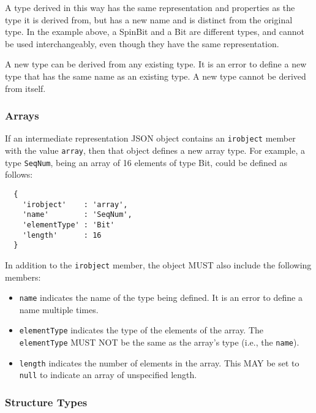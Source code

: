 \documentclass[twocolumn,a4paper]{article}
\begin{document}
A type derived in this way has the same representation and properties as
the type it is derived from, but has a new name and is distinct from the
original type.  In the example above, a SpinBit and a Bit are different
types, and cannot be used interchangeably, even though they have the same
representation.

A new type can be derived from any existing type. It is an error to define
a new type that has the same name as an existing type. A new type cannot be
derived from itself.

\subsubsection{Arrays}

If an intermediate representation JSON object contains an \texttt{irobject}
member with the value \texttt{array}, then that object defines a new array
type. For example, a type \texttt{SeqNum}, being an array of 16 elements of
type Bit, could be defined as follows:

\begin{verbatim}
  {
    'irobject'    : 'array',
    'name'        : 'SeqNum',
    'elementType' : 'Bit'
    'length'      : 16
  }
\end{verbatim}

In addition to the \texttt{irobject} member, the object MUST also include
the following members:
\begin{itemize}
  \item \texttt{name} indicates the name of the type being defined. It is
    an error to define a name multiple times.
  \item \texttt{elementType} indicates the type of the elements of the
    array. The \texttt{elementType} MUST NOT be the same as the array's
    type (i.e., the \texttt{name}).
  \item \texttt{length} indicates the number of elements in the array. This
    MAY be set to \texttt{null} to indicate an array of unspecified length.
\end{itemize}

\subsubsection{Structure Types}
\end{document}
